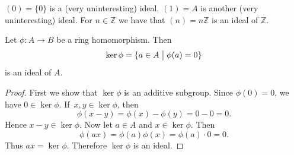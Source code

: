\documentclass[11pt]{article}
\begin{document}
\begin{ex}
    $(0) = \{0\}$ is a (very uninteresting) ideal. 
    $(1) = A$ is another (very uninteresting) ideal. 
    For $n \in \mathbb Z$ we have that $(n) = n\mathbb Z$ is 
    an ideal of $\mathbb Z$. 
\end{ex}

\begin{prop}
    Let $\phi : A \to B$ be a ring homomorphism. Then 
    \[
        \ker \phi = \{a \in A \bigm| \phi(a) = 0\}
    \]
    is an ideal of $A$.
\end{prop}

\begin{proof}
    First we show that $\ker \phi$ is an additive subgroup. 
    Since $\phi(0) = 0$, we have $0 \in \ker \phi$. 
    If $x,y \in \ker \phi$, then 
    \[
        \phi(x-y) = \phi(x) - \phi(y) = 0 - 0 = 0. 
    \]
    Hence $x-y \in \ker \phi$. 
    Now let $a \in A$ and $x \in \ker \phi$. Then 
    \[
        \phi(ax) = \phi(a)\phi(x) = \phi(a) \cdot 0 = 0. 
    \]
    Thus $ax = \ker \phi$. Therefore $\ker \phi$ is an ideal. 
\end{proof}
\end{document}
